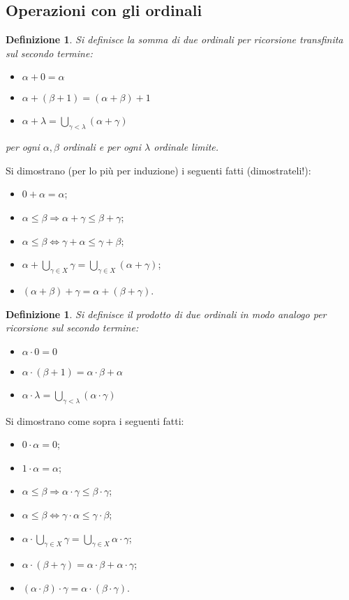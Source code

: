 \documentclass[a4paper,10pt,oneside]{article}
\theoremstyle{plain}
\newtheorem{mydef}[mytheorem]{Definizione}
\theoremstyle{definition}
\theoremstyle{remark}
\begin{document}
\subsection{Operazioni con gli ordinali}
\begin{mydef} Si definisce la somma di due ordinali per ricorsione transfinita sul secondo termine:
\begin{itemize}
   \item $\alpha + 0 = \alpha$
   \item $\alpha + (\beta+1)=(\alpha+\beta)+1$
   \item $\alpha + \lambda= \bigcup_{\gamma<\lambda}(\alpha+\gamma)$  
\end{itemize}
per ogni $\alpha, \beta$ ordinali e per ogni $\lambda$ ordinale limite.
\end{mydef}

Si dimostrano (per lo più per induzione) i seguenti fatti (dimostrateli!):
\begin{itemize}
 \item $0+\alpha=\alpha$;
 \item $\alpha \le \beta \Rightarrow \alpha+\gamma \le \beta + \gamma$;
 \item $\alpha \le \beta \Leftrightarrow \gamma+\alpha\le \gamma + \beta$;
 \item $\alpha + \bigcup_{\gamma \in X}\gamma = \bigcup_{\gamma \in X} (\alpha+\gamma)$;
 \item $(\alpha + \beta)+\gamma= \alpha + (\beta+\gamma)$. \qquad \qquad
\end{itemize}

\begin{mydef} Si definisce il prodotto di due ordinali in modo analogo per ricorsione sul secondo termine:
\begin{itemize}
   \item $\alpha \cdot 0 = 0$
   \item $\alpha \cdot (\beta+1) =\alpha\cdot\beta+\alpha$
   \item $\alpha \cdot \lambda= \bigcup_{\gamma<\lambda}(\alpha\cdot\gamma)$  
\end{itemize}
\end{mydef}

Si dimostrano come sopra i seguenti fatti:
\begin{itemize}
 \item $0\cdot\alpha=0$;
 \item $1\cdot \alpha =\alpha$;
 \item $\alpha \le \beta \Rightarrow \alpha\cdot\gamma \le \beta \cdot \gamma$;
 \item $\alpha \le \beta \Leftrightarrow \gamma\cdot\alpha\le \gamma \cdot \beta$;
 \item $\alpha \cdot \bigcup_{\gamma \in X}\gamma = \bigcup_{\gamma \in X} \alpha\cdot\gamma$;
 \item $\alpha\cdot(\beta+\gamma)=\alpha\cdot\beta+\alpha\cdot\gamma$;
 \item $(\alpha \cdot \beta)\cdot\gamma= \alpha \cdot (\beta\cdot\gamma)$. 
\end{itemize}
\end{document}
